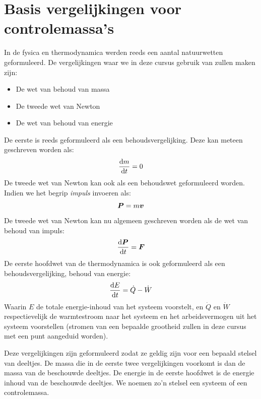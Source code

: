 	\section{Basis vergelijkingen voor controlemassa's}
	\label{sec:Basis vergelijkingen voor controlemassa's}
In de fysica en thermodynamica werden reeds een aantal natuurwetten geformuleerd. De vergelijkingen waar we in deze cursus gebruik van zullen maken zijn:
\begin{itemize}
	\item De wet van behoud van massa
	\item De tweede wet van Newton
	\item De wet van behoud van energie
\end{itemize}
De eerste is reeds geformuleerd als een behoudsvergelijking. Deze kan meteen geschreven worden als:
\begin{equation}
	\frac{\mathrm{d} m}{\mathrm{d} t} = 0
	\label{eqn:controlemassa,behoud van massa}
\end{equation}
De tweede wet van Newton kan ook als een behoudswet geformuleerd worden. Indien we het begrip \emph{impuls} invoeren als:
\begin{equation}
	\boldsymbol{P} = m\boldsymbol{v}
	\label{eqn:impuls}
\end{equation}
De tweede wet van Newton kan nu algemeen geschreven worden als de wet van behoud van impuls:
\begin{equation}
	\frac{\mathrm{d} \boldsymbol{P}}{\mathrm{d} t} = \boldsymbol{F}
	\label{eqn:controlemassa,behoud van impuls}
\end{equation}
De eerste hoofdwet van de thermodynamica is ook geformuleerd als een behoudsvergelijking, behoud van energie:
\begin{equation}
	\frac{\mathrm{d} E}{\mathrm{d} t} = \dot{Q}-\dot{W}
	\label{eqn:controlemassa,behoud van energie}
\end{equation}
Waarin $E$ de totale energie-inhoud van het systeem voorstelt, en $\dot{Q}$ en $\dot{W}$ respectievelijk de warmtestroom naar het systeem en het arbeidsvermogen uit het systeem voorstellen (stromen van een bepaalde grootheid zullen in deze cursus met een punt aangeduid worden).

Deze vergelijkingen zijn geformuleerd zodat ze geldig zijn voor een bepaald stelsel van deeltjes. 
De massa die in de eerste twee vergelijkingen voorkomt is dan de massa van de beschouwde deeltjes. De energie in de eerste hoofdwet is de energie inhoud van de beschouwde deeltjes. We noemen zo'n stelsel een systeem of een controlemassa.


